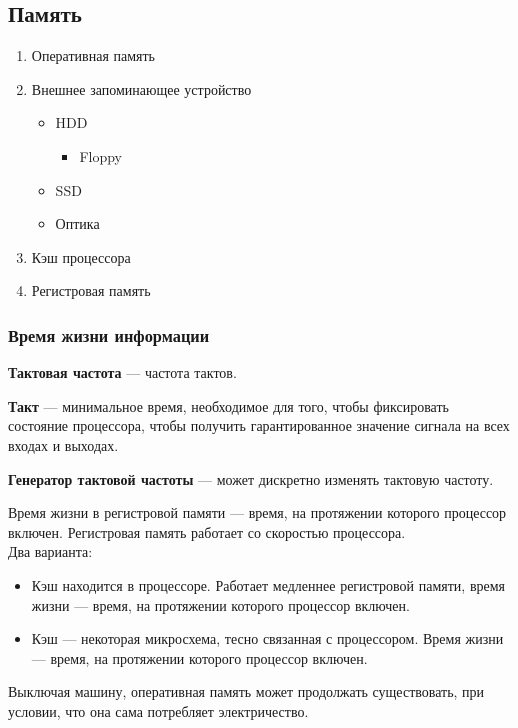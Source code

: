 \subsection{Память}

\begin{enumerate}
\item Оперативная память
\item Внешнее запоминающее устройство
\begin{itemize}
\item HDD
\begin{itemize}
\item Floppy
\end{itemize}
\item SSD
\item Оптика
\end{itemize}
\item Кэш процессора
\item Регистровая память
\end{enumerate}

\subsubsection{Время жизни информации}

\textbf{Тактовая частота} --- частота тактов.

\textbf{Такт} --- минимальное время, необходимое для того, чтобы фиксировать состояние процессора, чтобы получить гарантированное значение сигнала на всех входах и выходах.

\textbf{Генератор тактовой частоты} --- может дискретно изменять тактовую частоту.

Время жизни в регистровой памяти --- время, на протяжении которого процессор включен. Регистровая память работает со скоростью процессора.
\\

Два варианта:
\begin{itemize}
\item Кэш находится в процессоре. Работает медленнее регистровой памяти, время жизни --- время, на протяжении которого процессор включен.
\item Кэш --- некоторая микросхема, тесно связанная с процессором. Время жизни --- время, на протяжении которого процессор включен.
\end{itemize}

Выключая машину, оперативная память может продолжать существовать, при условии, что она сама потребляет электричество.
\\

